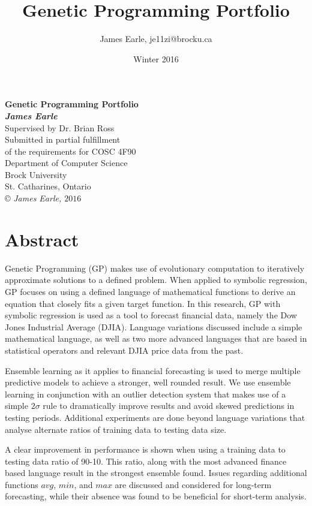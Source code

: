 \documentclass[12pt, letterpaper]{article}
\title{Genetic Programming Portfolio }
\author{James Earle, je11zi@brocku.ca}
\date{Winter 2016}
\begin{document}
\begin{titlepage}
\begin{center}
{\LARGE {\bf Genetic Programming Portfolio}}
\\[3cm]
{\large{ \bf \textit{James Earle}}}
{\large \\ Supervised by Dr. Brian Ross}
\\[3cm]
{\large Submitted in partial fulfillment\\ of the requirements for COSC 4F90}
\\[3cm]
{\large Department of Computer Science\\Brock University\\
St. Catharines, Ontario}
\\[5.5cm]
\copyright \textit{ James Earle, $ 2016 $}
\end{center}
\end{titlepage}

\section*{Abstract}

% 

\textrm{ \indent Genetic Programming (GP) makes use of evolutionary computation to iteratively approximate solutions to a defined problem. When applied to symbolic regression, GP focuses on using a defined language of mathematical functions to derive an equation that closely fits a given target function. In this research, GP with symbolic regression is used as a tool to forecast financial data, namely the Dow Jones Industrial Average (DJIA). Language variations discussed include a simple mathematical language, as well as two more advanced languages that are based in statistical operators and relevant DJIA price data from the past. }

\textrm{ \indent Ensemble learning as it applies to financial forecasting is used to merge multiple predictive models to achieve a stronger, well rounded result. We use ensemble learning in conjunction with an outlier detection system that makes use of a simple $2\sigma$ rule to dramatically improve results and avoid skewed predictions in testing periods. Additional experiments are done beyond language variations that analyse alternate ratios of training data to testing data size. }

\textrm{ \indent A clear improvement in performance is shown when using a training data to testing data ratio of 90-10. This ratio, along with the most advanced finance based language result in the strongest ensemble found. Issues regarding additional functions $avg$, $min$, and $max$ are discussed and considered for long-term forecasting, while their absence was found to be beneficial for short-term analysis. }
\end{document}
